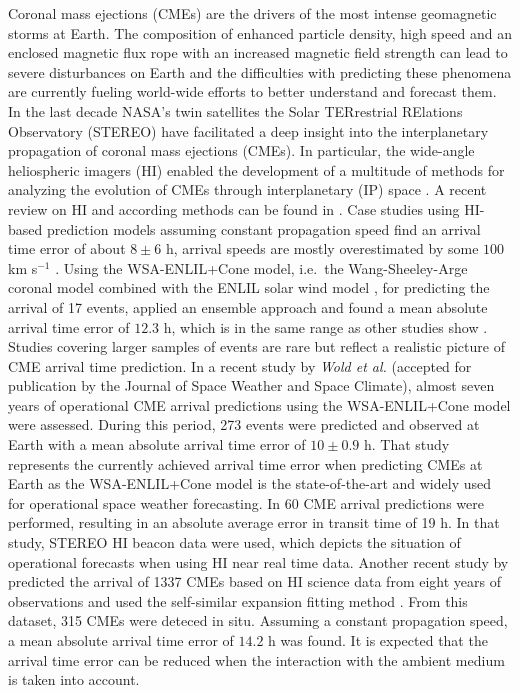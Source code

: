 \documentclass[draft]{agujournal}
\begin{document}
Coronal mass ejections (CMEs) are the drivers of the most intense geomagnetic storms at Earth. The composition of enhanced particle density, high speed and an enclosed magnetic flux rope with an increased magnetic field strength can lead to severe disturbances on Earth and the difficulties with predicting these phenomena are currently fueling world-wide efforts to better understand and forecast them.
In the last decade NASA's twin satellites the Solar TERrestrial RElations Observatory (STEREO) have facilitated a deep insight into the interplanetary propagation of coronal mass ejections (CMEs). In particular, the wide-angle heliospheric imagers (HI) enabled the development of a multitude of methods for analyzing the evolution of CMEs through interplanetary (IP) space \citep[][]{kahweb07, she99, rou08,lug09b,moe11,dav12,moedav13,rol12,rol13,rol14}. A recent review on HI and according methods can be found in \citet{har17}. Case studies using HI-based prediction models assuming constant propagation speed find an arrival time error of about $8 \pm 6$ h, arrival speeds are mostly overestimated by some $100$ km s$^{-1}$ \citep[e.g.][]{moe14}. Using the WSA-ENLIL+Cone model, i.e.\ the Wang-Sheeley-Arge coronal model \citep[WSA;][]{argpiz00,arg04} combined with the ENLIL solar wind model \citep[][]{ods03}, for predicting the arrival of 17 events, \citet{may15} applied an ensemble approach and found a mean absolute arrival time error of $12.3$ h, which is in the same range as other studies show \citep[][]{mil13,vrs14,rol16}. Studies covering larger samples of events are rare but reflect a realistic picture of CME arrival time prediction. In a recent study by \textit{Wold et al.} (accepted for publication by the Journal of Space Weather and Space Climate), almost seven years of operational CME arrival predictions using the WSA-ENLIL+Cone model were assessed. During this period, 273 events were predicted and observed at Earth with a mean absolute arrival time error of $10 \pm 0.9$ h. That study represents the currently achieved arrival time error when predicting CMEs at Earth as the WSA-ENLIL+Cone model is the state-of-the-art and widely used for operational space weather forecasting.
In \citet{tuc15} 60 CME arrival predictions were performed, resulting in an absolute average error in transit time of 19 h. In that study, STEREO HI beacon data were used, which depicts the situation of operational forecasts when using HI near real time data. Another recent study by \citet{moe17} predicted the arrival of 1337 CMEs based on HI science data from eight years of observations and used the self-similar expansion fitting method \citep[][]{moedav13}. From this dataset, 315 CMEs were deteced in situ. Assuming a constant propagation speed, a mean absolute arrival time error of $14.2$ h was found. It is expected that the arrival time error can be reduced when the interaction with the ambient medium is taken into account.
\end{document}
